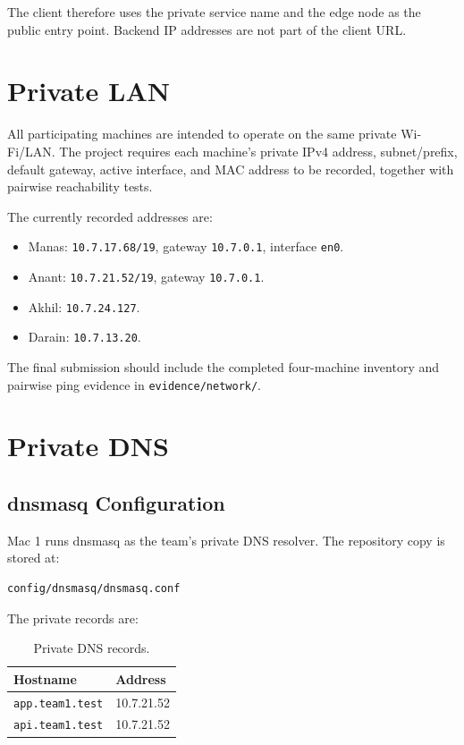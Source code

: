 \documentclass[11pt,a4paper]{article}
\begin{document}
The client therefore uses the private service name and the edge node as
the public entry point. Backend IP addresses are not part of the client
URL.

\section{Private LAN}

All participating machines are intended to operate on the same private
Wi-Fi/LAN. The project requires each machine's private IPv4 address,
subnet/prefix, default gateway, active interface, and MAC address to be
recorded, together with pairwise reachability tests.

The currently recorded addresses are:

\begin{itemize}
    \item Manas: \texttt{10.7.17.68/19}, gateway \texttt{10.7.0.1}, interface \texttt{en0}.
    \item Anant: \texttt{10.7.21.52/19}, gateway \texttt{10.7.0.1}.
    \item Akhil: \texttt{10.7.24.127}.
    \item Darain: \texttt{10.7.13.20}.
\end{itemize}

The final submission should include the completed four-machine inventory
and pairwise ping evidence in \texttt{evidence/network/}.

\section{Private DNS}

\subsection{dnsmasq Configuration}

Mac 1 runs dnsmasq as the team's private DNS resolver. The repository copy
is stored at:

\begin{lstlisting}
config/dnsmasq/dnsmasq.conf
\end{lstlisting}

The private records are:

\begin{table}[H]
\centering
\begin{tabular}{ll}
\toprule
\textbf{Hostname} & \textbf{Address} \\
\midrule
\texttt{app.team1.test} & 10.7.21.52 \\
\texttt{api.team1.test} & 10.7.21.52 \\
\bottomrule
\end{tabular}
\caption{Private DNS records.}
\end{table}
\end{document}
